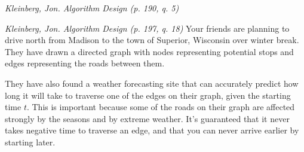 \documentclass[solutionorbox]{exam}
\begin{document}
\begin{questions}

\pagebreak
\question
 \emph{Kleinberg, Jon. Algorithm Design (p. 190, q. 5)}
 
 \pagebreak
 \question
 \emph{Kleinberg, Jon. Algorithm Design (p. 197, q. 18)} Your friends are planning to drive north from Madison to the town of Superior, Wisconsin over winter break. They have drawn a directed graph with nodes representing potential stops and edges representing the roads between them.
 
 They have also found a weather forecasting site that can accurately predict how long it will take to traverse one of the edges on their graph, given the starting time $t$. This is important because some of the roads on their graph are affected strongly by the seasons and by extreme weather. It's guaranteed that it never takes negative time to traverse an edge, and that you can never arrive earlier by starting later.
 
\end{questions}
\end{document}
